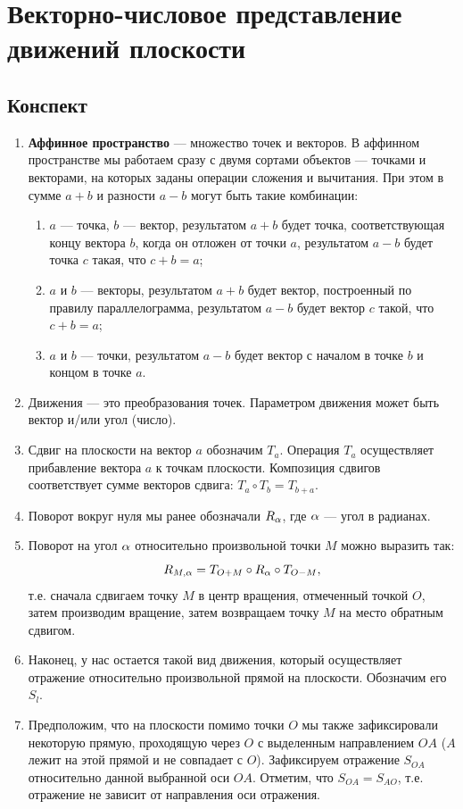 \section{Векторно-числовое представление движений плоскости}

\subsection*{Конспект}

\begin{enumerate}
\item \textbf{Аффинное пространство} --- множество точек и векторов. В аффинном пространстве мы работаем сразу с двумя сортами объектов --- точками и векторами, на которых заданы операции сложения и вычитания. При этом в сумме $a+b$ и разности $a-b$ могут быть такие комбинации:
\begin{enumerate}[1)]
\item $a$ --- точка, $b$ --- вектор, результатом $a+b$ будет точка, соответствующая концу вектора $b$, когда он отложен от точки $a$, результатом $a-b$ будет точка $c$ такая, что $c+b=a$;
\item $a$ и $b$ --- векторы, результатом $a+b$ будет вектор, построенный по правилу параллелограмма, результатом $a-b$ будет вектор $c$ такой, что $c+b=a$;
\item $a$ и $b$ --- точки, результатом $a-b$ будет вектор с началом в точке $b$ и концом в точке $a$.
\end{enumerate}
\item Движения --- это преобразования точек. Параметром движения может быть вектор и/или угол (число).
\item Сдвиг на плоскости на вектор $a$ обозначим $T_a$. Операция $T_a$ осуществляет прибавление вектора $a$ к точкам плоскости. Композиция сдвигов соответствует сумме векторов сдвига: $T_a\circ T_b=T_{b+a}$.
\item Поворот вокруг нуля мы ранее обозначали $R_\alpha$, где $\alpha$ --- угол в радианах.
\item Поворот на угол $\alpha$ относительно произвольной точки $M$ можно выразить так:
$$
R_{M,\alpha} = T_{O+M}\circ R_\alpha\circ T_{O-M},
$$
т.е. сначала сдвигаем точку $M$ в центр вращения, отмеченный точкой $O$, затем производим вращение, затем возвращаем точку $M$ на место обратным сдвигом.
\item Наконец, у нас остается такой вид движения, который осуществляет отражение относительно произвольной прямой на плоскости. Обозначим его $S_l$.
\item Предположим, что на плоскости помимо точки $O$ мы также зафиксировали некоторую прямую, проходящую через $O$ с выделенным направлением $OA$ ($A$ лежит на этой прямой и не совпадает с $O$). Зафиксируем отражение $S_{OA}$ относительно данной выбранной оси $OA$. Отметим, что $S_{OA}=S_{AO}$, т.е. отражение не зависит от направления оси отражения.

\end{enumerate}
